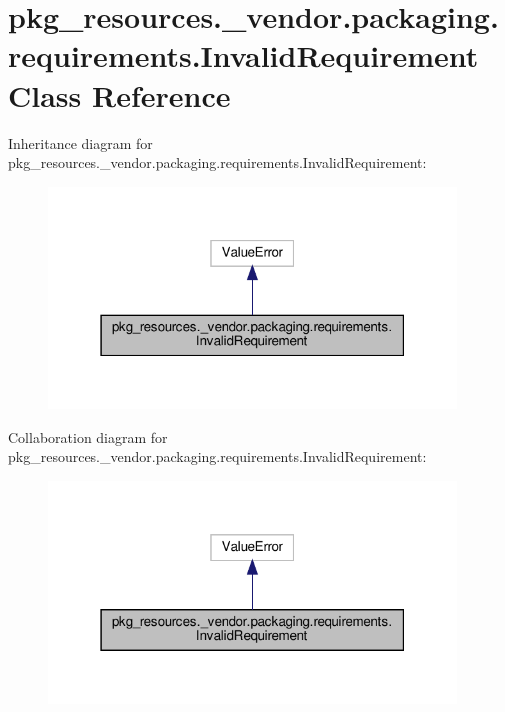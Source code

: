 \hypertarget{classpkg__resources_1_1__vendor_1_1packaging_1_1requirements_1_1InvalidRequirement}{}\section{pkg\+\_\+resources.\+\_\+vendor.\+packaging.\+requirements.\+Invalid\+Requirement Class Reference}
\label{classpkg__resources_1_1__vendor_1_1packaging_1_1requirements_1_1InvalidRequirement}


Inheritance diagram for pkg\+\_\+resources.\+\_\+vendor.\+packaging.\+requirements.\+Invalid\+Requirement\+:
\nopagebreak
\begin{figure}[H]
\begin{center}
\leavevmode
\includegraphics[width=307pt]{classpkg__resources_1_1__vendor_1_1packaging_1_1requirements_1_1InvalidRequirement__inherit__graph}
\end{center}
\end{figure}


Collaboration diagram for pkg\+\_\+resources.\+\_\+vendor.\+packaging.\+requirements.\+Invalid\+Requirement\+:
\nopagebreak
\begin{figure}[H]
\begin{center}
\leavevmode
\includegraphics[width=307pt]{classpkg__resources_1_1__vendor_1_1packaging_1_1requirements_1_1InvalidRequirement__coll__graph}
\end{center}
\end{figure}


